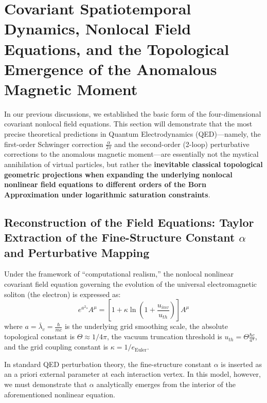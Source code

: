 \documentclass[12pt, a4paper]{article}
\begin{document}
\section{Covariant Spatiotemporal Dynamics, Nonlocal Field Equations, and the Topological Emergence of the Anomalous Magnetic Moment}

In our previous discussions, we established the basic form of the four-dimensional covariant nonlocal field equations. This section will demonstrate that the most precise theoretical predictions in Quantum Electrodynamics (QED)---namely, the first-order Schwinger correction $\frac{\alpha}{2\pi}$ and the second-order (2-loop) perturbative corrections to the anomalous magnetic moment---are essentially not the mystical annihilation of virtual particles, but rather the \textbf{inevitable classical topological geometric projections when expanding the underlying nonlocal nonlinear field equations to different orders of the Born Approximation under logarithmic saturation constraints}.

\subsection{Reconstruction of the Field Equations: Taylor Extraction of the Fine-Structure Constant $\alpha$ and Perturbative Mapping}

Under the framework of ``computational realism,'' the nonlocal nonlinear covariant field equation governing the evolution of the universal electromagnetic soliton (the electron) is expressed as:
\begin{equation}
e^{a^2\square} A^\mu = \left[ 1 + \kappa \ln\left(1 + \frac{u_{inv}}{u_{th}}\right) \right] A^\mu
\end{equation}
where $a = \bar{\lambda}_c = \frac{\hbar}{mc}$ is the underlying grid smoothing scale, the absolute topological constant is $\Theta \approx 1/4\pi$, the vacuum truncation threshold is $u_{th} = \Theta \frac{\hbar c}{a^4}$, and the grid coupling constant is $\kappa = 1/e_{\text{Euler}}$.

In standard QED perturbation theory, the fine-structure constant $\alpha$ is inserted as an a priori external parameter at each interaction vertex. In this model, however, we must demonstrate that $\alpha$ analytically emerges from the interior of the aforementioned nonlinear equation.
\end{document}
